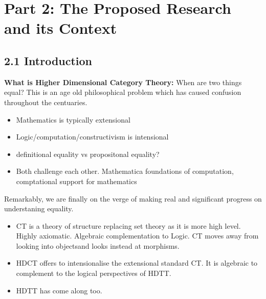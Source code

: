 \documentclass[a4paper,10pt]{article}
\newcommand{\gap}{\protect{\hspace*{0.5em}}}
\begin{document}
\pagebreak


\section*{Part 2: The Proposed Research and its Context}

\subsection*{2.1  \gap Introduction}\label{sec:intro}

{\bf What is Higher Dimensional Category Theory:} When are two things
equal?  This is an age old philosophical problem which has caused
confusion throughout the centuaries. 

\begin{itemize}
\item Mathematics is typically extensional
\item Logic/computation/constructivism is intensional
\item definitional equality vs propositonal equality?
\item Both challenge each other. Mathematica foundations of
  computation, comptational support for mathematics
\end{itemize}  
Remarkably, we are finally on the verge of making real and
significant progress on understaning equality.
\begin{itemize}
\item CT is a theory of structure replacing set theory as it is more
  high level. Highly axiomatic. Algebraic complementation to Logic. CT
  moves away from looking into objectsand looks instead at morphisms.
\item HDCT offers to intensionalise the extensional standard CT. It is
  algebraic to complement to the logical perspectives of HDTT.
\item HDTT has come along too.
\end{itemize}
\end{document}

